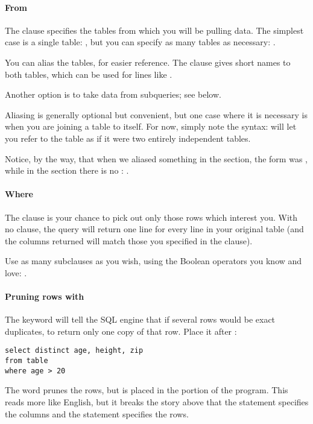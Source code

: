 \paragraph{From} The  clause specifies the tables from which
you will be pulling data. The simplest case is a single table: , but you can specify as many tables as necessary: . 

You can alias the tables, for easier reference. The clause 
 gives short names to both tables, which can
be used for lines like . 

Another option is to take data from subqueries; see below.

Aliasing is generally optional but convenient, but one case where
it is necessary is when you are joining a table to itself.
For now, simply note the syntax:  will let
you refer to the  table as if it were two entirely independent
tables. 

Notice, by the way, that when we aliased something in the 
section, the form was , while
in the  section there is no : .

\paragraph{Where}
The  clause is your chance to pick out only those rows which
interest you. With no  clause, the query will return one line
for every line in your original table (and the columns returned will
match those you specified in the  clause).

Use as many subclauses as you wish, using the Boolean operators you
know and love: .


\paragraph{Pruning rows with } The 
keyword will tell the SQL engine that if several rows would be exact
duplicates, to return only one copy of that row. Place it after 
: 
\begin{lstlisting}
select distinct age, height, zip
from table
where age > 20
\end{lstlisting}
The   word prunes the rows, but is placed in the 
 portion of the program.  This reads more like English, but it
breaks the story above that the  statement specifies the
columns and the  statement specifies the rows.


